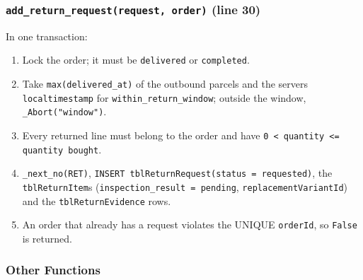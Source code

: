 \hypertarget{add_return_requestrequest-order-line-30}{%
\subsubsection{\texorpdfstring{\texttt{add\_\allowbreak{}return\_\allowbreak{}request(\allowbreak{}request,\allowbreak{} order)}
(line
30)}{add\_return\_request(request, order) (line 30)}}\label{add_return_requestrequest-order-line-30}}

In one transaction:

\begin{enumerate}
\def\labelenumi{\arabic{enumi}.}
\tightlist
\item
  Lock the order; it must be \texttt{delivered} or \texttt{completed}.
\item
  Take \texttt{max(\allowbreak{}delivered\_\allowbreak{}at)} of the outbound parcels and the
  server\textquotesingle s \texttt{localtimestamp} for
  \texttt{within\_\allowbreak{}return\_\allowbreak{}window}; outside the window,
  \texttt{\_\allowbreak{}Abort(\allowbreak{}"window")}.
\item
  Every returned line must belong to the order and have
  \texttt{0 \textless{} quantity \textless{}=\allowbreak{} quantity bought}.
\item
  \texttt{\_\allowbreak{}next\_\allowbreak{}no(\allowbreak{}\textquotesingle{}RET\textquotesingle{})},
  \texttt{INSERT tblReturnRequest(\allowbreak{}status =\allowbreak{} requested)}, the
  \texttt{tblReturnItem}s (\texttt{inspection\_\allowbreak{}result =\allowbreak{} pending},
  \texttt{replacementVariantId}) and the \texttt{tblReturnEvidence}
  rows.
\item
  An order that already has a request violates the UNIQUE
  \texttt{orderId}, so \texttt{False} is returned.
\end{enumerate}

\hypertarget{other-functions-1}{%
\subsubsection{Other Functions}\label{other-functions-1}}


